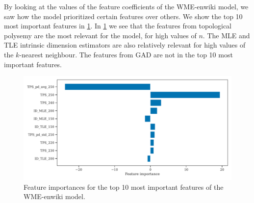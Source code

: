 By looking at the values of the feature coefficients of the WME-enwiki model, we saw how the model prioritized certain features over others. We show the top 10 most important features in \cref{fig:wme-enwiki-feature-importances}. In \cref{fig:wme-enwiki-feature-importances} we see that the features from topological polysemy are the most relevant for the model, for high values of $n$. The MLE and TLE intrinsic dimension estimators are also relatively relevant for high values of the $k$-nearest neighbour. The features from GAD are not in the top 10 most important features.
\begin{figure}[H]
    \centering
    \includegraphics[width=\textwidth]{thesis/figures/wme-enwiki-top-10-feature-importances.pdf}
    \caption{Feature importances for the top 10 most important features of the WME-enwiki model.}
    \label{fig:wme-enwiki-feature-importances}
\end{figure}

